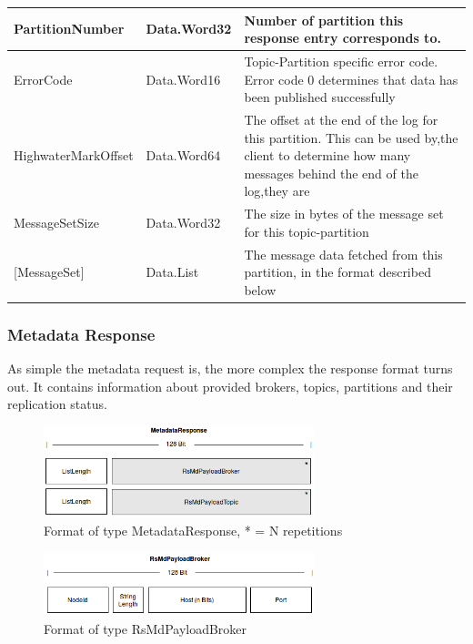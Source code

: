 \begin{table}[H]
\centering
\begin{tabular}{ l  l  p{10cm} }
\hline
PartitionNumber     & Data.Word32 & Number of partition this response entry corresponds to.                                                                                               \\ \hline
ErrorCode           & Data.Word16 & Topic-Partition specific error code. Error code 0 determines that data has been published successfully                                                \\ \hline
HighwaterMarkOffset & Data.Word64 & The offset at the end of the log for this partition. This can be used by,the client to determine how many messages behind the end of the log,they are \\ \hline
MessageSetSize      & Data.Word32 & The size in bytes of the message set for this topic-partition                                                                                         \\ \hline
{[}MessageSet{]}    & Data.List   & The message data fetched from this partition, in the format described below                                                                           \\ \hline
\end{tabular}
\end{table}

\subsubsection{Metadata Response}
As simple the metadata request is, the more complex the response format turns
out. It contains information about provided brokers, topics, partitions and
their replication status. 

\begin{figure}[H]
    \centering
    \includegraphics[width=0.7\textwidth]{images/impl-prot-types-metadataResponse.png}
    \caption{Format of type MetadataResponse, * = N repetitions}
\end{figure}

\begin{figure}[H]
    \centering
    \includegraphics[width=0.7\textwidth]{images/impl-prot-types-mdPayloadBroker.png}
    \caption{Format of type RsMdPayloadBroker} 
\end{figure}

